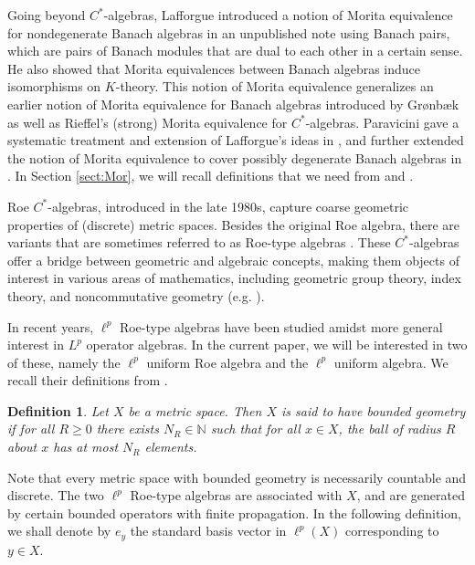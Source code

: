 \documentclass[a4,11pt]{amsart}
\newtheorem{defn}[thm]{Definition}
\theoremstyle{remark}
\begin{document}
Going beyond $C^*$-algebras, Lafforgue introduced a notion of Morita equivalence for nondegenerate Banach algebras in an unpublished note \cite{Laf04} using Banach pairs, which are pairs of Banach modules that are dual to each other in a certain sense. He also showed that Morita equivalences between Banach algebras induce isomorphisms on $K$-theory.
This notion of Morita equivalence generalizes an earlier notion of Morita equivalence for Banach algebras introduced by Gr\o{}nb\ae k \cite{Gro95,Gro96} as well as Rieffel's (strong) Morita equivalence for $C^*$-algebras.
Paravicini gave a systematic treatment and extension of Lafforgue's ideas in \cite{Par09}, and further extended the notion of Morita equivalence to cover possibly degenerate Banach algebras in \cite[Section 1.2]{Par15}.
In Section \ref{sect:Mor}, we will recall definitions that we need from \cite{Laf02} and \cite{Par09}.

Roe $C^*$-algebras, introduced in the late 1980s, capture coarse geometric properties of (discrete) metric spaces.
Besides the original Roe algebra, there are variants that are sometimes referred to as Roe-type algebras \cite[Definition 2.1]{SW13a}.
These $C^*$-algebras offer a bridge between geometric and algebraic concepts, making them objects of interest in various areas of mathematics, including geometric group theory, index theory, and noncommutative geometry (e.g. \cite{Chung20,LL,LW,SW13,SW13a,Wei,Yu00}). 

In recent years, $\ell^p$ Roe-type algebras have been studied \cite{Chung18,Chung21a,Chung23,LWZ,SW,ZZ} amidst more general interest in $L^p$ operator algebras. 
In the current paper, we will be interested in two of these, namely the $\ell^p$ uniform Roe algebra and the $\ell^p$ uniform algebra.
We recall their definitions from \cite{Chung18}.

\begin{defn}
Let $X$ be a metric space. Then $X$ is said to have \emph{bounded geometry} if for all $R\geq 0$ there exists $N_R\in\mathbb{N}$ such that for all $x\in X$, the ball of radius $R$ about $x$ has at most $N_R$ elements.
\end{defn}

Note that every metric space with bounded geometry is necessarily countable and discrete.
The two $\ell^p$ Roe-type algebras are associated with $X$, and are generated by certain bounded operators with finite propagation.
In the following definition, we shall denote by $e_y$ the standard basis vector in $\ell^p(X)$ corresponding to $y\in X$.
\end{document}
